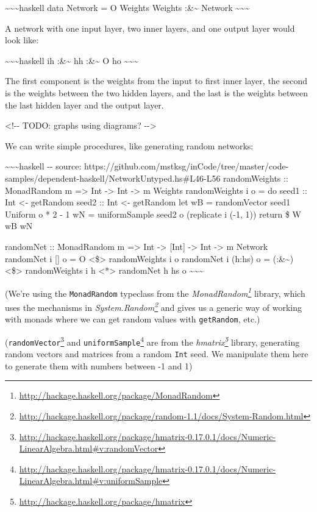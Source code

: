 \documentclass[]{article}
\renewcommand{\href}[2]{#2\footnote{\url{#1}}}
\begin{document}
\textasciitilde{}\textasciitilde{}\textasciitilde{}haskell data Network = O
Weights \textbar{} Weights :\&\textasciitilde{} Network
\textasciitilde{}\textasciitilde{}\textasciitilde{}

A network with one input layer, two inner layers, and one output layer would
look like:

\textasciitilde{}\textasciitilde{}\textasciitilde{}haskell ih
:\&\textasciitilde{} hh :\&\textasciitilde{} O ho
\textasciitilde{}\textasciitilde{}\textasciitilde{}

The first component is the weights from the input to first inner layer, the
second is the weights between the two hidden layers, and the last is the weights
between the last hidden layer and the output layer.

\textless{}!-\/- TODO: graphs using diagrams? -\/-\textgreater{}

We can write simple procedures, like generating random networks:

\textasciitilde{}\textasciitilde{}\textasciitilde{}haskell -\/- source:
https://github.com/mstksg/inCode/tree/master/code-samples/dependent-haskell/NetworkUntyped.hs\#L46-L56
randomWeights :: MonadRandom m =\textgreater{} Int -\textgreater{} Int
-\textgreater{} m Weights randomWeights i o = do seed1 :: Int \textless{}-
getRandom seed2 :: Int \textless{}- getRandom let wB = randomVector seed1
Uniform o * 2 - 1 wN = uniformSample seed2 o (replicate i (-1, 1)) return \$ W
wB wN

randomNet :: MonadRandom m =\textgreater{} Int -\textgreater{} {[}Int{]}
-\textgreater{} Int -\textgreater{} m Network randomNet i {[}{]} o = O
\textless{}\$\textgreater{} randomWeights i o randomNet i (h:hs) o =
(:\&\textasciitilde{}) \textless{}\$\textgreater{} randomWeights i h
\textless{}*\textgreater{} randomNet h hs o
\textasciitilde{}\textasciitilde{}\textasciitilde{}

(We're using the \texttt{MonadRandom} typeclass from the
\emph{\href{http://hackage.haskell.org/package/MonadRandom}{MonadRandom}}
library, which uses the mechanisms in
\emph{\href{http://hackage.haskell.org/package/random-1.1/docs/System-Random.html}{System.Random}}
and gives us a generic way of working with monads where we can get random values
with \texttt{getRandom}, etc.)

(\href{http://hackage.haskell.org/package/hmatrix-0.17.0.1/docs/Numeric-LinearAlgebra.html\#v:randomVector}{\texttt{randomVector}}
and
\href{http://hackage.haskell.org/package/hmatrix-0.17.0.1/docs/Numeric-LinearAlgebra.html\#v:uniformSample}{\texttt{uniformSample}}
are from the \emph{\href{http://hackage.haskell.org/package/hmatrix}{hmatrix}}
library, generating random vectors and matrices from a random \texttt{Int} seed.
We manipulate them here to generate them with numbers between -1 and 1)
\end{document}
